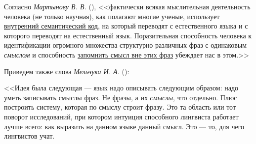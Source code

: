 \begin{SCn}
\begin{scnsubstruct}
{			Согласно \textit{Мартынову В. В.} (\cite{Martynov}), <<фактически
			всякая мыслительная деятельность человека (не только научная), как полагают
			многие ученые, использует \uline{внутренний семантический код}, на который
			переводят с естественного языка и с которого переводят на естественный язык.
			Поразительная способность человека к идентификации огромного множества
			структурно различных фраз с одинаковым \textit{смыслом} и способность
			\uline{запомнить смысл вне этих фраз} убеждает нас в этом.>>
			
			Приведем также слова \textit{Мельчука И. А.} (\cite{MelchukST}):
			
			<<Идея была следующая --- язык надо описывать следующим образом: надо уметь записывать смыслы фраз. \uline{Не
			фразы, а их \textit{смыслы}}, что отдельно. Плюс построить систему, которая по
			смыслу строит фразу. Это та область или тот поворот исследований, при котором
			интуиция способного лингвиста работает лучше всего: как выразить на данном
			языке данный смысл. Это --- то, для чего лингвистов учат.
			
}
\end{scnsubstruct}
\end{SCn}
